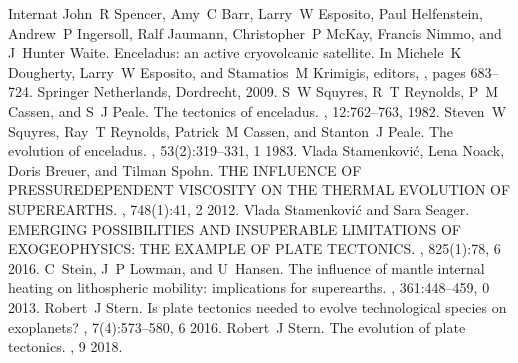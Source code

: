 \documentclass[letterpaper,10pt,english]{jupyterBook}
\begin{document}
\begin{sphinxthebibliography}{Internat}
\sphinxAtStartPar
John R Spencer, Amy C Barr, Larry W Esposito, Paul Helfenstein, Andrew P Ingersoll, Ralf Jaumann, Christopher P McKay, Francis Nimmo, and J Hunter Waite. Enceladus: an active cryovolcanic satellite. In Michele K Dougherty, Larry W Esposito, and Stamatios M Krimigis, editors, , pages 683–724. Springer Netherlands, Dordrecht, 2009.
\sphinxAtStartPar
S W Squyres, R T Reynolds, P M Cassen, and S J Peale. The tectonics of enceladus. , 12:762–763, 1982.
\sphinxAtStartPar
Steven W Squyres, Ray T Reynolds, Patrick M Cassen, and Stanton J Peale. The evolution of enceladus. , 53(2):319–331, 1 1983.
\sphinxAtStartPar
Vlada Stamenković, Lena Noack, Doris Breuer, and Tilman Spohn. THE INFLUENCE OF PRESSURE\sphinxhyphen{}DEPENDENT VISCOSITY ON THE THERMAL EVOLUTION OF SUPER\sphinxhyphen{}EARTHS. , 748(1):41, 2 2012.
\sphinxAtStartPar
Vlada Stamenković and Sara Seager. EMERGING POSSIBILITIES AND INSUPERABLE LIMITATIONS OF EXOGEOPHYSICS: THE EXAMPLE OF PLATE TECTONICS. , 825(1):78, 6 2016.
\sphinxAtStartPar
C Stein, J P Lowman, and U Hansen. The influence of mantle internal heating on lithospheric mobility: implications for super\sphinxhyphen{}earths. , 361:448–459, 0 2013.
\sphinxAtStartPar
Robert J Stern. Is plate tectonics needed to evolve technological species on exoplanets? , 7(4):573–580, 6 2016.
\sphinxAtStartPar
Robert J Stern. The evolution of plate tectonics. , 9 2018.
\sphinxAtStartPar

\end{sphinxthebibliography}
\end{document}
